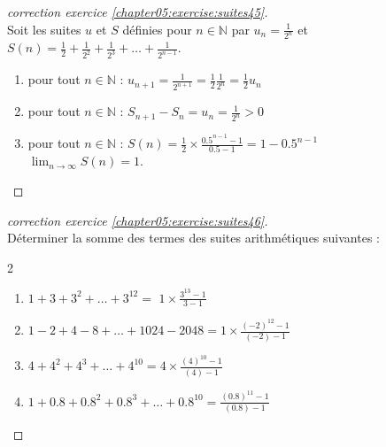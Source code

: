 \documentclass[main.tex]{subfiles}
\begin{document}
\begin{proof}[correction exercice \ref{chapter05:exercise:suites45}] \hfill\\
Soit les suites $u$ et $S$  définies  pour $n\in\mathbb{N}$ par $u_n=\frac{1}{2^n}$ et $S(n)=\frac{1}{2}+\frac{1}{2^2}+\frac{1}{2^3}+\ldots + \frac{1}{2^{n-1}}$.
	\begin{enumerate}[leftmargin=*,label=\arabic*)]
	\item \colorbox{BurntOrange}{pour tout $n\in\mathbb{N}$ : $u_{n+1}=\frac{1}{2^{n+1}}=\frac{1}{2}\frac{1}{2^n}=\frac{1}{2}u_n$}
	\item \colorbox{BurntOrange}{pour tout $n\in\mathbb{N}$ : $S_{n+1}-S_{n}=u_n=\frac{1}{2^n}>0$}
	\item \colorbox{BurntOrange}{pour tout $n\in\mathbb{N}$ :  $S(n)=\frac{1}{2}\times \frac{0.5^{n-1}-1}{0.5-1}=1-0.5^{n-1}$}\\
	 \colorbox{BurntOrange}{ $\lim_{n\to\infty}S(n)=1$}.
 \end{enumerate} 	
\end{proof} 
\begin{proof}[correction exercice \ref{chapter05:exercise:suites46}]\hfill\\
Déterminer la somme des termes des suites arithmétiques suivantes :
	\begin{spacing}{2}
		\vspace{-0.5em}
		\begin{enumerate}[leftmargin=*,label=\arabic*)]
			\item $1+3+3^2+\ldots +3^{12}=$ \colorbox{BurntOrange}{$1\times\frac{3^{13}-1}{3-1} $} 
			\item $1-2+4-8+\ldots +1024-2048=$\colorbox{BurntOrange}{$1\times \frac{(-2)^{12}-1}{(-2)-1} $}  
			\item $4+4^2+4^3+\ldots +4^{10} =$\colorbox{BurntOrange}{$4\times \frac{(4)^{10}-1}{(4)-1} $}  
			\item $1+0.8+0.8^2+0.8^3+\ldots + 0.8^{10}=$\colorbox{BurntOrange}{$\frac{(0.8)^{11}-1}{(0.8)-1} $}  
		\end{enumerate}
	\end{spacing}
	\vspace{-0.75em}
\end{proof}  
\end{document}
